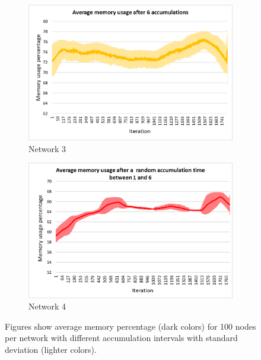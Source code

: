 \documentclass[USenglish]{uit-thesis}
\begin{document}
\begin{figure}
\begin{subfigure}[b]{0.475\textwidth}
            \includegraphics[width=\textwidth]{Mem_stdev_6.png}
            \caption[]%
            {{\small Network 3}}    
            \label{fig:memfig3}
        \end{subfigure}
        \quad
        \begin{subfigure}[b]{0.475\textwidth}   
            \centering 
            \includegraphics[width=\textwidth]{Mem_stdev_rand.png}
            \caption[]%
            {{\small Network 4}}    
            \label{fig:memfig4}
        \end{subfigure}
        \caption[ Figures show average memory percentage for 100 nodes per network with different accumulation intervals with standard deviation.]
        {\small Figures show average memory percentage (dark colors) for 100 nodes per network with different accumulation intervals with standard deviation (lighter colors).} 
        \label{fig:memChart}
    \end{figure}
\end{document}

